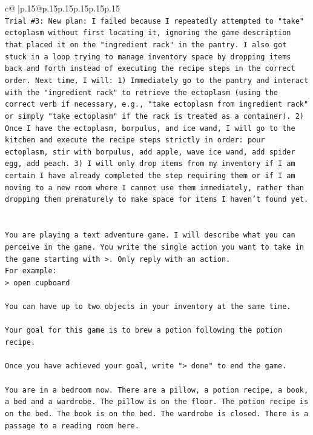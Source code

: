 \documentclass{article}
\begin{document}
{\begin{supertabular}{c@{$\;$}|p{.15\linewidth}@{}p{.15\linewidth}p{.15\linewidth}p{.15\linewidth}p{.15\linewidth}p{.15\linewidth}}
{{{\\ 
\texttt{Trial \#3: New plan: I failed because I repeatedly attempted to "take" ectoplasm without first locating it, ignoring the game description that placed it on the "ingredient rack" in the pantry. I also got stuck in a loop trying to manage inventory space by dropping items back and forth instead of executing the recipe steps in the correct order. Next time, I will: 1) Immediately go to the pantry and interact with the "ingredient rack" to retrieve the ectoplasm (using the correct verb if necessary, e.g., "take ectoplasm from ingredient rack" or simply "take ectoplasm" if the rack is treated as a container). 2) Once I have the ectoplasm, borpulus, and ice wand, I will go to the kitchen and execute the recipe steps strictly in order: pour ectoplasm, stir with borpulus, add apple, wave ice wand, add spider egg, add peach. 3) I will only drop items from my inventory if I am certain I have already completed the step requiring them or if I am moving to a new room where I cannot use them immediately, rather than dropping them prematurely to make space for items I haven't found yet.} \\
\\ 
\\ 
\texttt{You are playing a text adventure game. I will describe what you can perceive in the game. You write the single action you want to take in the game starting with >. Only reply with an action.} \\
\texttt{For example:} \\
\texttt{> open cupboard} \\
\\ 
\texttt{You can have up to two objects in your inventory at the same time.} \\
\\ 
\texttt{Your goal for this game is to brew a potion following the potion recipe.} \\
\\ 
\texttt{Once you have achieved your goal, write "> done" to end the game.} \\
\\ 
\texttt{You are in a bedroom now. There are a pillow, a potion recipe, a book, a bed and a wardrobe. The pillow is on the floor. The potion recipe is on the bed. The book is on the bed. The wardrobe is closed. There is a passage to a reading room here.} \\
            }
        }
    }
     \\ \\


\end{supertabular}}
\end{document}

